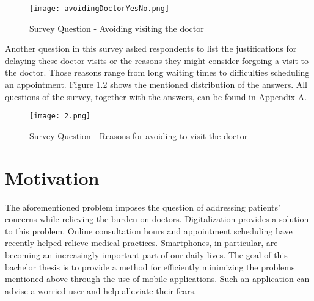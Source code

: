 \begin{figure}[H]
	\centering
	\texttt{[image: avoidingDoctorYesNo.png]}
	\caption[Survey Question]{Survey Question - Avoiding visiting the doctor}
\end{figure}
\noindent 
Another question in this survey asked respondents to list the justifications for delaying these doctor visits or the reasons they might consider forgoing a visit to the doctor. Those reasons range from long waiting times to difficulties scheduling an appointment. Figure 1.2 shows the mentioned distribution of the answers. All questions of the survey, together with the answers, can be found in Appendix A.
\begin{figure}[H]
	\centering
	\texttt{[image: 2.png]}
	\caption[Survey Question]{Survey Question - Reasons for avoiding to visit the doctor}
\end{figure}
\noindent 

\section{Motivation}
The aforementioned problem imposes the question of addressing patients' concerns while relieving the burden on doctors. Digitalization provides a solution to this problem. Online consultation hours and appointment scheduling have recently helped relieve medical practices. Smartphones, in particular, are becoming an increasingly important part of our daily lives. The goal of this bachelor thesis is to provide a method for efficiently minimizing the problems mentioned above through the use of mobile applications. Such an application can advise a worried user and help alleviate their fears.

